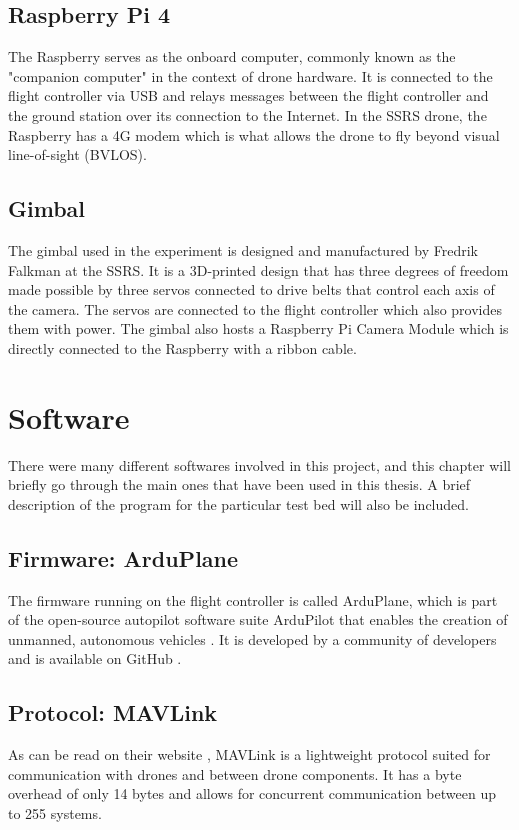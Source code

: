 \documentclass[nofilelist]{cslthse-msc}
\begin{document}
\subsection{Raspberry Pi 4}
The Raspberry serves as the onboard computer, commonly known as the "companion computer" in the context of drone hardware. It is connected to the flight controller via USB and relays messages between the flight controller and the ground station over its connection to the Internet. In the SSRS drone, the Raspberry has a 4G modem which is what allows the drone to fly beyond visual line-of-sight (BVLOS).

\subsection{Gimbal}
The gimbal used in the experiment is designed and manufactured by Fredrik Falkman at the SSRS. It is a 3D-printed design that has three degrees of freedom made possible by three servos connected to drive belts that control each axis of the camera. The servos are connected to the flight controller which also provides them with power. The gimbal also hosts a Raspberry Pi Camera Module which is directly connected to the Raspberry with a ribbon cable.  

\section{Software}
There were many different softwares involved in this project, and this chapter will briefly go through the main ones that have been used in this thesis. A brief description of the program for the particular test bed will also be included.

\subsection{Firmware: ArduPlane}
\label{sec:ardupilot}
The firmware running on the flight controller is called ArduPlane, which is part of the open-source autopilot software suite ArduPilot that enables the creation of unmanned, autonomous vehicles \cite{ardupilot-org}. It is developed by a community of developers and is available on GitHub \cite{ardupilot-github}.

\subsection{Protocol: MAVLink}
As can be read on their website \cite{mavlink}, MAVLink is a lightweight protocol suited for communication with drones and between drone components. It has a byte overhead of only 14 bytes and allows for concurrent communication between up to 255 systems. 
\end{document}
